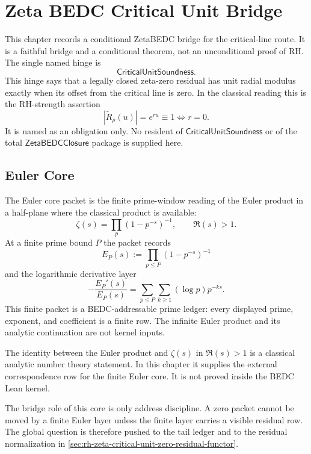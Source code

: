 \chapter{Zeta BEDC Critical Unit Bridge}
\label{ch:visions-rh-bedc-zeta-critical-unit}

This chapter records a conditional ZetaBEDC bridge for the critical-line
route. It is a faithful bridge and a conditional theorem, not an
unconditional proof of RH. The single named hinge is
$$
\mathsf{CriticalUnitSoundness}.
$$
This hinge says that a legally closed zeta-zero residual has unit radial
modulus exactly when its offset from the critical line is zero. In the
classical reading this is the RH-strength assertion
$$
|\widetilde R_{\rho}(u)|=e^{ru}\equiv 1
\Longleftrightarrow
r=0.
$$
It is named as an obligation only. No resident of
$\mathsf{CriticalUnitSoundness}$ or of the total
$\mathsf{ZetaBEDCClosure}$ package is supplied here.

\section{Euler Core}
\label{sec:rh-zeta-critical-unit-euler-core}

\begin{definition}
\label{def:rh-zeta-critical-unit-euler-core}
The Euler core packet is the finite prime-window reading of the Euler
product in a half-plane where the classical product is available:
$$
\zeta(s)=\prod_p (1-p^{-s})^{-1},
\qquad
\Re(s)>1.
$$
At a finite prime bound $P$ the packet records
$$
E_P(s):=\prod_{p\leq P}(1-p^{-s})^{-1}
$$
and the logarithmic derivative layer
$$
-\frac{E_P'(s)}{E_P(s)}
=
\sum_{p\leq P}\sum_{k\geq 1}(\log p)p^{-ks}.
$$
This finite packet is a BEDC-addressable prime ledger: every displayed
prime, exponent, and coefficient is a finite row. The infinite Euler
product and its analytic continuation are not kernel inputs.
\end{definition}

\begin{principle}
\label{prin:rh-zeta-critical-unit-classical-euler}
The identity between the Euler product and $\zeta(s)$ in $\Re(s)>1$ is
a classical analytic number theory statement. In this chapter it supplies
the external correspondence row for the finite Euler core. It is not
proved inside the BEDC Lean kernel.
\end{principle}

The bridge role of this core is only address discipline. A zero packet
cannot be moved by a finite Euler layer unless the finite layer carries a
visible residual row. The global question is therefore pushed to the tail
ledger and to the residual normalization in
\autoref{sec:rh-zeta-critical-unit-zero-residual-functor}.

